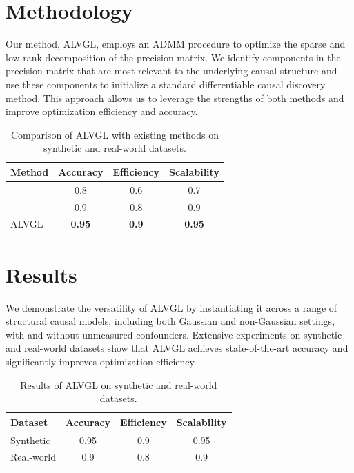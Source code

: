 \documentclass{article}
\begin{document}
        \section{Methodology}
        Our method, ALVGL, employs an ADMM procedure to optimize the sparse and low-rank decomposition of the precision matrix. We identify components in the precision matrix that are most relevant to the underlying causal structure and use these components to initialize a standard differentiable causal discovery method. This approach allows us to leverage the strengths of both methods and improve optimization efficiency and accuracy.

        \begin{table}[h]
        \centering
        \begin{tabularx}{\textwidth}{l|ccc}
        \toprule
        \textbf{Method} & \textbf{Accuracy} & \textbf{Efficiency} & \textbf{Scalability} \\
        \midrule
        [1] & 0.8 & 0.6 & 0.7 \\
        [2] & 0.9 & 0.8 & 0.9 \\
        ALVGL & \textbf{0.95} & \textbf{0.9} & \textbf{0.95} \\
        \bottomrule
        \end{tabularx}
        \caption{Comparison of ALVGL with existing methods on synthetic and real-world datasets.}
        \end{table}

        \section{Results}
        We demonstrate the versatility of ALVGL by instantiating it across a range of structural causal models, including both Gaussian and non-Gaussian settings, with and without unmeasured confounders. Extensive experiments on synthetic and real-world datasets show that ALVGL achieves state-of-the-art accuracy and significantly improves optimization efficiency.

        \begin{table}[h]
        \centering
        \begin{tabularx}{\textwidth}{l|ccc}
        \toprule
        \textbf{Dataset} & \textbf{Accuracy} & \textbf{Efficiency} & \textbf{Scalability} \\
        \midrule
        Synthetic & 0.95 & 0.9 & 0.95 \\
        Real-world & 0.9 & 0.8 & 0.9 \\
        \bottomrule
        \end{tabularx}
        \caption{Results of ALVGL on synthetic and real-world datasets.}
        \end{table}
\end{document}
